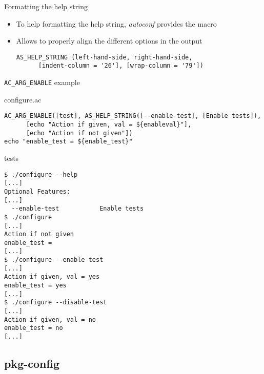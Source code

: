 \begin{frame}[fragile]{Formatting the help string}
  \begin{itemize}
  \item To help formatting the help string, {\em autoconf} provides
    the  macro
  \item Allows to properly align the different options in the
     output
\begin{block}{}
\begin{verbatim}
AS_HELP_STRING (left-hand-side, right-hand-side,
      [indent-column = '26'], [wrap-column = '79'])
\end{verbatim}
\end{block}
  \end{itemize}
\end{frame}

\begin{frame}[fragile]{{\tt AC\_ARG\_ENABLE} example}

\begin{block}{configure.ac}
\begin{verbatim}
AC_ARG_ENABLE([test], AS_HELP_STRING([--enable-test], [Enable tests]),
      [echo "Action if given, val = ${enableval}"],
      [echo "Action if not given"])
echo "enable_test = ${enable_test}"
\end{verbatim}
\end{block}

\begin{block}{ tests}
\begin{verbatim}
$ ./configure --help
[...]
Optional Features:
[...]
  --enable-test           Enable tests
$ ./configure
[...]
Action if not given
enable_test = 
[...]
$ ./configure --enable-test
[...]
Action if given, val = yes
enable_test = yes
[...]
$ ./configure --disable-test
[...]
Action if given, val = no
enable_test = no
[...]
\end{verbatim}
\end{block}

\end{frame}

\subsection{pkg-config}

